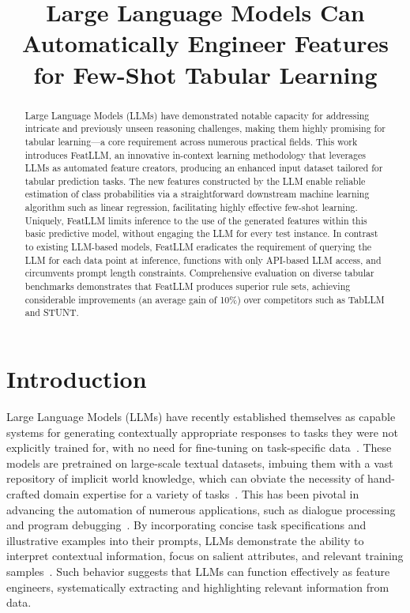 \title{Large Language Models Can Automatically Engineer Features for Few-Shot Tabular Learning}

\begin{abstract}
Large Language Models (LLMs) have demonstrated notable capacity for addressing intricate and previously unseen reasoning challenges, making them highly promising for tabular learning—a core requirement across numerous practical fields. This work introduces \textsf{FeatLLM}, an innovative in-context learning methodology that leverages LLMs as automated feature creators, producing an enhanced input dataset tailored for tabular prediction tasks. The new features constructed by the LLM enable reliable estimation of class probabilities via a straightforward downstream machine learning algorithm such as linear regression, facilitating highly effective few-shot learning. Uniquely, \textsf{FeatLLM} limits inference to the use of the generated features within this basic predictive model, without engaging the LLM for every test instance. In contrast to existing LLM-based models, \textsf{FeatLLM} eradicates the requirement of querying the LLM for each data point at inference, functions with only API-based LLM access, and circumvents prompt length constraints. Comprehensive evaluation on diverse tabular benchmarks demonstrates that \textsf{FeatLLM} produces superior rule sets, achieving considerable improvements (an average gain of 10\%) over competitors such as TabLLM and STUNT.
\end{abstract}

\section{Introduction}
Large Language Models (LLMs) have recently established themselves as capable systems for generating contextually appropriate responses to tasks they were not explicitly trained for, with no need for fine-tuning on task-specific data~\cite{creswell2022selection,imani2023mathprompter,taylor2022galactica}. These models are pretrained on large-scale textual datasets, imbuing them with a vast repository of implicit world knowledge, which can obviate the necessity of hand-crafted domain expertise for a variety of tasks~\cite{Genomes2021,singhal2023large,wilcox2003role}. This has been pivotal in advancing the automation of numerous applications, such as dialogue processing~\cite{finch2023leveraging} and program debugging~\cite{fan2023automated}. By incorporating concise task specifications and illustrative examples into their prompts, LLMs demonstrate the ability to interpret contextual information, focus on salient attributes, and relevant training samples~\cite{brown2020language,zhao2023survey}. Such behavior suggests that LLMs can function effectively as feature engineers, systematically extracting and highlighting relevant information from data. 

